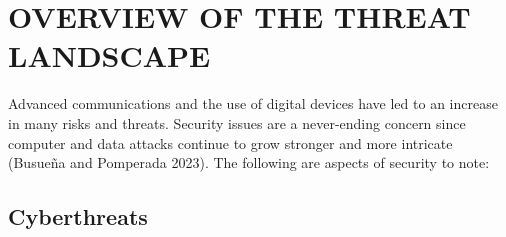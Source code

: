 \documentclass[
  letterpaper,
  DIV=11,
  numbers=noendperiod]{scrreprt}
\begin{document}
\section{OVERVIEW OF THE THREAT
LANDSCAPE}\label{overview-of-the-threat-landscape}

Advanced communications and the use of digital devices have led to an
increase in many risks and threats. Security issues are a never-ending
concern since computer and data attacks continue to grow stronger and
more intricate (Busueña and Pomperada 2023). The following are aspects
of security to note:

\subsection{Cyberthreats}\label{cyberthreats}
\end{document}
